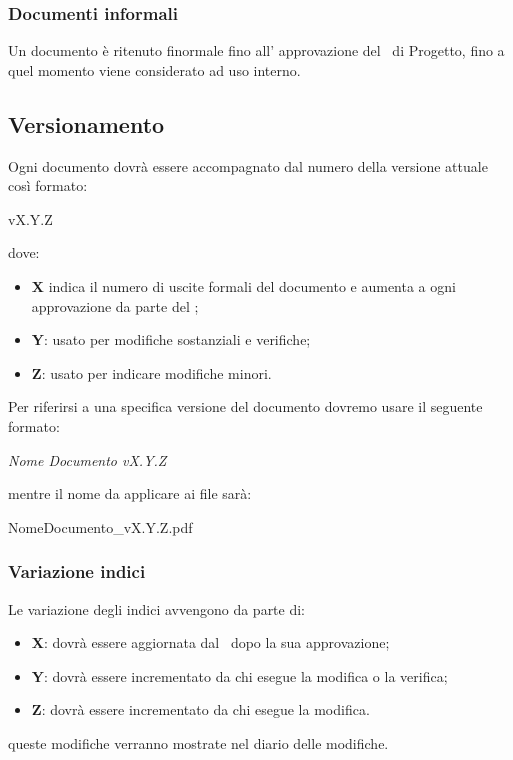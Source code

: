 \documentclass[../NormeDiProgetto.tex]{subfiles}
\begin{document}
		\subsubsection{Documenti informali}
		Un documento è ritenuto finormale fino all' approvazione del \responsabilediprogetto\ di Progetto, fino a quel momento viene considerato ad uso interno. 
		
		\subsection{Versionamento}
		Ogni documento dovrà essere accompagnato dal numero della versione attuale così formato:
		\begin{center}
			vX.Y.Z
		\end{center}
		dove:
		\begin{itemize}
			\item \textbf{X} indica il numero di uscite formali del documento e  aumenta a ogni approvazione da parte del \responsabilediprogetto ;
			\item \textbf{Y}: usato per modifiche sostanziali e verifiche;
			\item \textbf{Z}: usato per indicare modifiche minori. 
		\end{itemize}
		Per riferirsi a una specifica versione del documento dovremo usare il seguente formato:\\
		\begin{center}
			\textit{Nome Documento vX.Y.Z}
		\end{center}
		mentre il nome da applicare ai file sarà:
		\begin{center}
			NomeDocumento\_vX.Y.Z.pdf
		\end{center}
		\subsubsection{Variazione indici}
		Le variazione degli indici avvengono da parte di:
		\begin{itemize}
			\item \textbf{X}: dovrà essere aggiornata dal \responsabilediprogetto\ dopo la sua approvazione;
			\item \textbf{Y}: dovrà essere incrementato da chi esegue la modifica o la verifica;
			\item \textbf{Z}: dovrà essere incrementato da chi esegue la modifica.
		\end{itemize}
		queste modifiche verranno mostrate nel diario delle modifiche.
		
\end{document}
